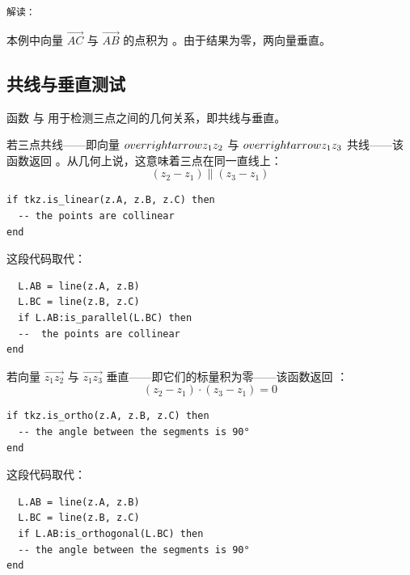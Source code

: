 \medskip
\texttt{解读：}

本例中向量 $\overrightarrow{AC}$ 与 $\overrightarrow{AB}$ 的点积为 。由于结果为零，两向量垂直。

%

\subsection{共线与垂直测试}
\label{sub:alignment_or_orthogonality}

函数  与  用于检测三点之间的几何关系，即共线与垂直。

\medskip
\textbf{}
若三点共线——即向量 $\\overrightarrow{z_1z_2}$ 与 $\\overrightarrow{z_1z_3}$ 共线——该函数返回 。从几何上说，这意味着三点在同一直线上：
\[
(z_2 - z_1) \parallel (z_3 - z_1)
\]

\begin{mybox}
\begin{verbatim}
if tkz.is_linear(z.A, z.B, z.C) then
  -- the points are collinear
end
\end{verbatim}
\end{mybox}

这段代码取代：

\begin{mybox}
\begin{verbatim}
  L.AB = line(z.A, z.B)
  L.BC = line(z.B, z.C)
  if L.AB:is_parallel(L.BC) then
  --  the points are collinear
end
\end{verbatim}
\end{mybox}

\medskip
\textbf{}
若向量 $\overrightarrow{z_1z_2}$ 与 $\overrightarrow{z_1z_3}$ 垂直——即它们的标量积为零——该函数返回 ：
\[
(z_2 - z_1) \cdot (z_3 - z_1) = 0
\]

\begin{mybox}
\begin{verbatim}
if tkz.is_ortho(z.A, z.B, z.C) then
  -- the angle between the segments is 90°
end
\end{verbatim}
\end{mybox}

这段代码取代：

\begin{mybox}
\begin{verbatim}
  L.AB = line(z.A, z.B)
  L.BC = line(z.B, z.C)
  if L.AB:is_orthogonal(L.BC) then
  -- the angle between the segments is 90°
end
\end{verbatim}
\end{mybox}

